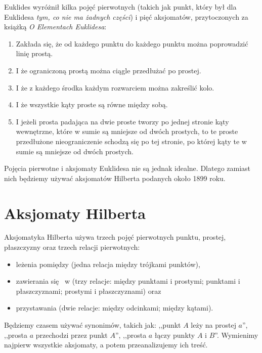Euklides wyróżnił kilka pojęć pierwotnych (takich jak punkt, który był dla Euklidesa \emph{tym, co nie ma żadnych części}) i pięć aksjomatów, przytoczonych za książką \emph{O Elementach Euklidesa}:

\begin{enumerate}
	\item Zakłada się, że od każdego punktu do każdego punktu można poprowadzić linię prostą.
	\item I że ograniczoną prostą można ciągle przedłużać po prostej.
	\item I że z każdego środka każdym rozwarciem można zakreślić kolo.
	\item I że wszystkie kąty proste są równe między sobą.
	\item I jeżeli prosta padająca na dwie proste tworzy po jednej stronie kąty wewnętrzne, które w sumie są mniejsze od dwóch prostych, to te proste przedłużone nieograniczenie schodzą się po tej stronie, po której kąty te w sumie są mniejsze od dwóch prostych.
\end{enumerate}

Pojęcia pierwotne i aksjomaty Euklidesa nie są jednak idealne.
Dlatego zamiast nich będziemy używać aksjomatów Hilberta podanych około 1899 roku.

\section{Aksjomaty Hilberta}
Aksjomatyka Hilberta używa trzech pojęć pierwotnych punktu, prostej, płaszczyzny oraz trzech relacji pierwotnych:
\begin{itemize}
	\item leżenia pomiędzy (jedna relacja między trójkami punktów),
	\item zawierania się  w (trzy relacje: między punktami i prostymi; punktami i płaszczyznami; prostymi i płaszczyznami) oraz
	\item przystawania (dwie relacje: między odcinkami; między kątami).
\end{itemize}
Będziemy czasem używać synonimów, takich jak: ,,punkt $A$ leży na prostej $a$'', ,,prosta $a$ przechodzi przez punkt $A$'', ,,prosta $a$ łączy punkty $A$ i $B$''.
Wymienimy najpierw wszystkie aksjomaty, a potem przeanalizujemy ich treść.

